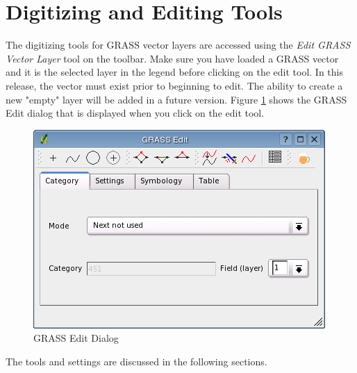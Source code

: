 \section{Digitizing and Editing Tools}
\label{grass_digitising}
The digitizing tools for GRASS vector layers are accessed using the \textsl{Edit GRASS Vector Layer} tool on the toolbar. Make sure you have loaded a GRASS vector and it is the selected layer in the legend before clicking on the edit tool. In this release, the vector must exist prior to beginning to edit. The ability to create a new "empty" layer will be added in a future version. Figure \ref{fig:grass_edit} shows the GRASS Edit dialog that is displayed when you click on the edit tool. 
\begin{figure}[h]
   \begin{center}
   \caption{GRASS Edit Dialog}\label{fig:grass_edit}\smallskip
   \includegraphics[scale=.7]{qgis_user_guide_images/grassedit}
\end{center}  
\end{figure}
The tools and settings are discussed in the following sections.
